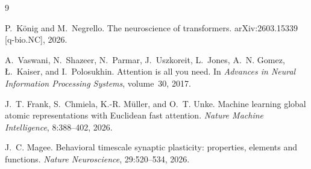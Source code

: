 \documentclass[11pt]{article}
\begin{document}

\begin{thebibliography}{9}

P.~K\"{o}nig and M.~Negrello.
\newblock The neuroscience of transformers.
\newblock arXiv:2603.15339 [q-bio.NC], 2026.

A.~Vaswani, N.~Shazeer, N.~Parmar, J.~Uszkoreit, L.~Jones, A.~N. Gomez,
  \L.~Kaiser, and I.~Polosukhin.
\newblock Attention is all you need.
\newblock In \emph{Advances in Neural Information Processing Systems},
  volume~30, 2017.

J.~T. Frank, S.~Chmiela, K.-R. M\"{u}ller, and O.~T. Unke.
\newblock Machine learning global atomic representations with {Euclidean} fast
  attention.
\newblock \emph{Nature Machine Intelligence}, 8:388--402, 2026.

J.~C. Magee.
\newblock Behavioral timescale synaptic plasticity: properties, elements and
  functions.
\newblock \emph{Nature Neuroscience}, 29:520--534, 2026.

\end{thebibliography}
\end{document}
